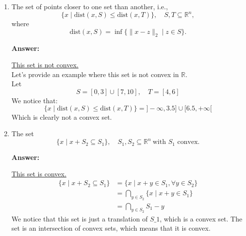 \documentclass[11pt,a4paper]{article}
\newenvironment{solution}{
  \par\noindent\textbf{Answer:}\vspace{0.3em}
}{\vspace{1em}}
\begin{document}
\begin{enumerate}
\begin{solution}
    \underline{This set is convex.}\\
    Let $y \in S$, and $x_0 \in \mathbb{R}^n$.
    \begin{align*}
        \|x - x_0\|_2 \leq \|x - y\|_2
        &\Leftrightarrow (x - x_0)^T (x - x_0) \leq (x - y)^T (x - y)\\
        &\Leftrightarrow x^T x - 2 x_{0}^T x + x_{0}^T x_0 \leq x^T x - 2y^T x + y^T y\\
        &\Leftrightarrow 2(y - x_0)^T x \leq y^T y - x_{0}^T x_0
    \end{align*}
    Notice that the norm inequality is equivalent to a halfspace $a^T x \leq b$, with
    \[
        a = 2(y - x_0), \quad b = y^T y - x_{0}^T x_0.
    \]
    We get the following equality:
    \begin{align*}
        \{ x \mid \|x - x_0\|_2 \leq \|x - y\|_2 \ \text{for all } y\in S \} 
        &= \bigcap_{y \in S} \{x \mid \|x - x_0\|_2 \leq \|x - y\|_2\}\\
        &= \bigcap_{y \in S} \{x \mid 2(y - x_0)^T x \leq y^T y - x_{0}^T x_0\}
    \end{align*}
    Since the set is the intersection of halfspaces, it is convex.
\end{solution}



\item The set of points closer to one set than another, i.e.,
\[
    \{ x \mid \mathrm{dist}(x, S) \leq \mathrm{dist}(x, T) \},\quad S, T \subseteq \mathbb{R}^n,
\]
where
\[
\mathrm{dist}(x, S) = \inf \{ \| x - z \|_2 \mid z \in S \}.
\]

\begin{solution}
    \underline{This set is not convex.}\\
    Let's provide an example where this set is not convex in $\mathbb{R}$.\\
    Let
    \[S = [0,3] \cup [7, 10], \quad T = [4, 6]\]
    We notice that:
    \[
        \{ x \mid \mathrm{dist}(x, S) \leq \mathrm{dist}(x, T) \} = ]-\infty, 3.5] \cup [6.5, +\infty[
    \]
    Which is clearly not a convex set.
\end{solution}


\item The set
\[
    \{ x \mid x + S_2 \subseteq S_1 \}, \quad S_1, S_2 \subseteq\mathbb{R}^n \ \text{with } S_1 \text{ convex}.
\]

\begin{solution}
    \underline{This set is convex.}\\
    \begin{align*}
        \{ x \mid x + S_2 \subseteq S_1 \}
        &= \{x \mid x + y \in S_1, \forall y \in S_2\}\\
        &= \bigcap_{y \in S_2} \{x \mid x + y \in S_1\}\\
        &= \bigcap_{y \in S_2} S_1 - y
    \end{align*}
    We notice that this set is just a translation of $S\_1$, which is a convex set. The set is an intersection of convex sets, which means that it is convex.
\end{solution}


\end{enumerate}
\end{document}
